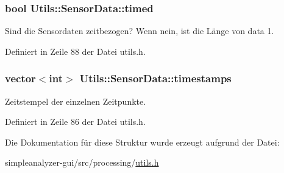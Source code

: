 \hypertarget{structUtils_1_1SensorData_aca94c3ec7e8f2e719f7cfcff4e9da41b}{
\subsubsection[{timed}]{\setlength{\rightskip}{0pt plus 5cm}bool Utils\-::\-Sensor\-Data\-::timed}}\label{structUtils_1_1SensorData_aca94c3ec7e8f2e719f7cfcff4e9da41b}


Sind die Sensordaten zeitbezogen? Wenn nein, ist die Länge von data 1. 



Definiert in Zeile 88 der Datei utils.\-h.

\hypertarget{structUtils_1_1SensorData_a654f9606c3ddc6e93afb86a116d11ea5}{
\subsubsection[{timestamps}]{\setlength{\rightskip}{0pt plus 5cm}vector$<$int$>$ Utils\-::\-Sensor\-Data\-::timestamps}}\label{structUtils_1_1SensorData_a654f9606c3ddc6e93afb86a116d11ea5}


Zeitstempel der einzelnen Zeitpunkte. 



Definiert in Zeile 86 der Datei utils.\-h.



Die Dokumentation für diese Struktur wurde erzeugt aufgrund der Datei\-:\begin{DoxyCompactItemize}
\item 
simpleanalyzer-\/gui/src/processing/\hyperlink{utils_8h}{utils.\-h}\end{DoxyCompactItemize}
